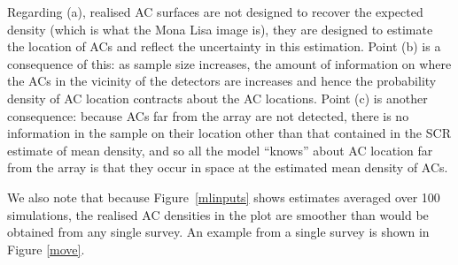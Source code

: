 \documentclass[10pt,a4paper]{article}
\begin{document}
Regarding (a), realised AC surfaces are not designed to recover the expected density (which is what the Mona Lisa image is), they are designed to estimate the location of ACs and reflect the uncertainty in this estimation. Point (b) is a consequence of this: as sample size increases, the amount of information on where the ACs in the vicinity of the detectors are increases and hence the probability density of AC location contracts about the AC locations. Point (c) is another consequence: because ACs far from the array are not detected, there is no information in the sample on their location other than that contained in the SCR estimate of mean density, and so all the model ``knows'' about AC location far from the array is that they occur in space at the estimated mean density of ACs. 

We also note that because Figure~\ref{mlinputs} shows estimates averaged over 100 simulations, the realised AC densities in the plot are smoother than would be obtained from any single survey. An example from a single survey is shown in Figure \ref{move}.


\end{document}
